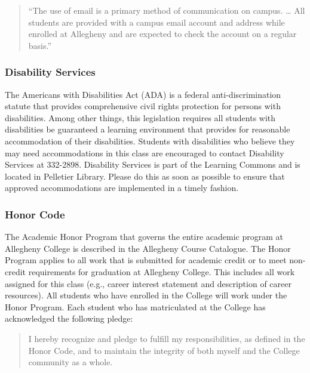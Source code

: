 \vspace*{-.1in}
\begin{quote}
  ``The use of email is a primary method of communication on campus. \ldots
  All students are provided with a campus email account and address while
  enrolled at Allegheny and are expected to check the account on a regular
  basis.'' 
\end{quote}
\vspace*{-.15in}

\subsubsection*{Disability Services}

The Americans with Disabilities Act (ADA) is a federal anti-discrimination statute that provides comprehensive civil
rights protection for persons with disabilities.  Among other things, this legislation requires all students with
disabilities be guaranteed a learning environment that provides for reasonable accommodation of their disabilities.
Students with disabilities who believe they may need accommodations in this class are encouraged to contact Disability
Services at 332-2898.  Disability Services is part of the Learning Commons and is located in Pelletier Library.
Please do this as soon as possible to ensure that approved accommodations are implemented in a timely fashion.

\subsubsection*{Honor Code}

The Academic Honor Program that governs the entire academic program at Allegheny College is described in the Allegheny
Course Catalogue.  The Honor Program applies to all work that is submitted for academic credit or to meet non-credit
requirements for graduation at Allegheny College.  This includes all work assigned for this class (e.g., career interest
statement and description of career resources).  All students who have enrolled in the College
will work under the Honor Program.  Each student who has matriculated at the College has acknowledged the following
pledge:

\begin{quote}
  I hereby recognize and pledge to fulfill my responsibilities, as defined in the Honor Code, and to maintain the
  integrity of both myself and the College community as a whole.  
\end{quote}

